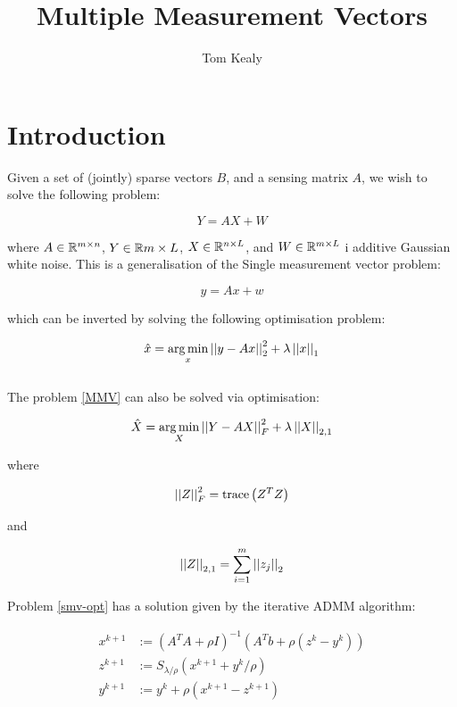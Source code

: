 \documentclass{article}
\title{Multiple Measurement Vectors}
\author{Tom Kealy}
\begin{document}
\maketitle

\section{Introduction}
Given a set of (jointly) sparse vectors \(B\), and a sensing matrix \(A\), we wish to solve the following problem:

\begin{equation}
Y = AX + W
\label{MMV}
\end{equation}

where \(A \in {\mathbb{R}}^{m \times n}\), \(Y \in {\mathbb{R}}{m \times L}\), \(X \in {\mathbb{R}}^{n \times L}\), and \(W \in {\mathbb{R}}^{m \times L}\) i additive Gaussian white noise. This is a generalisation of the Single measurement vector problem:

\begin{equation}
y = Ax + w
\label{SMV}
\end{equation}

which can be inverted by solving the following optimisation problem:

\begin{equation}
\hat{x} = \operatorname*{arg\,min}_{x} \left|\left|y - Ax\right|\right|_2^2 + \lambda\left|\left|x\right|\right|_1
\label{smv-opt}
\end{equation}
\\
The problem \eqref{MMV} can also be solved via optimisation:

\begin{equation}
\hat{X} = \operatorname*{arg\,min}_{X} \left|\left|Y-AX\right|\right|_{F}^2 + \lambda\left|\left|X\right|\right|_{2,1}
\label{mmv-opt}
\end{equation}

where

\begin{equation}
\left|\left|Z\right|\right|_F^2 = \mathrm{trace}\left(Z^TZ\right)
\end{equation}

and 

\begin{equation}
\left|\left|Z\right|\right|_{2,1} = \sum_{i=1}^m \left|\left|z_j\right|\right|_2
\end{equation}

Problem \eqref{smv-opt} has a solution given by the iterative ADMM algorithm:

\begin{align}
x^{k+1} &:= \left(A^TA + \rho I\right)^{-1}\left(A^Tb +\rho\left(z^k - y^k\right)\right)\\
z^{k+1} &:= S_{\lambda/\rho}\left(x^{k+1} + y^k/\rho\right)
 \\
y^{k+1} &:= y^{k} + \rho \left(x^{k+1}-z^{k+1}\right)
\label{smv-admm}
\end{align}
\end{document}
